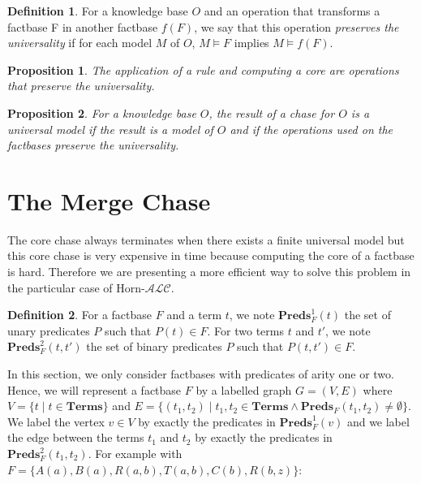 \documentclass{article}
\newtheorem{proposition}{Proposition}[section]
\theoremstyle{definition}
\newtheorem{definition}{Definition}[section]
\theoremstyle{remark}
\newcommand{\Terms}{\textbf{Terms}}
\newcommand{\Preds}{\textbf{Preds}}
\begin{document}
\begin{definition}
For a knowledge base $O$ and an operation that transforms a factbase F in another factbase $f(F)$, we say that this operation \emph{preserves the universality} if for each model $M$ of $O$, $M \models F$ implies $M \models f(F)$. 
\end{definition}

\begin{proposition} \label{universality application}
The application of a rule and computing a core are operations that preserve the universality.
\end{proposition}

\begin{proposition}
For a knowledge base $O$, the result of a chase for $O$ is a universal model if the result is a model of $O$ and if the operations used on the factbases preserve the universality.
\end{proposition}

\section{The Merge Chase}

The core chase always terminates when there exists a finite universal model but this core chase is very expensive in time because computing the core of a factbase is hard. Therefore we are presenting a more efficient way to solve this problem in the particular case of Horn-$\mathcal{ALC}$.

\begin{definition}
For a factbase $F$ and a term $t$, we note \emph{$\Preds^1_F(t)$} the set of unary predicates $P$ such that $P(t)\in F$. For two terms $t$ and $t'$, we note \emph{$\Preds^2_F(t,t')$} the set of binary predicates $P$ such that $P(t,t')\in F$.
\end{definition}

In this section, we only consider factbases with predicates of arity one or two. Hence, we will represent a factbase $F$ by a labelled graph $G = (V,E)$ where $V = \{t \mid t \in \Terms \}$ and $E = \{(t_1,t_2) \mid t_1,t_2 \in \Terms \wedge \Preds_F(t_1,t_2) \neq \emptyset\}$. We label the vertex $v \in V$ by exactly the predicates in $\Preds_F^1(v)$ and we label the edge between the terms $t_1$ and $t_2$ by exactly the predicates in $\Preds^2_F(t_1,t_2)$. For example with $F = \{A(a), B(a),R(a,b),T(a,b),C(b),R(b,z)\}$: \\

\end{document}
